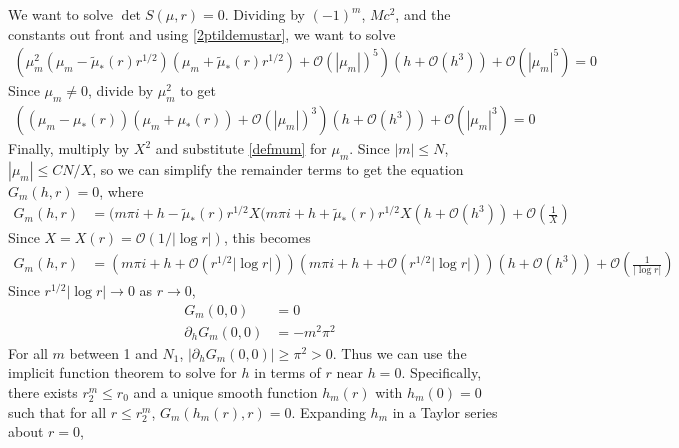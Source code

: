 \documentclass[thesis.tex]{subfiles}
\begin{document}
We want to solve $\det S(\mu, r) = 0$. Dividing by $(-1)^m$, $M c^2$, and the constants out front and using \cref{2ptildemustar}, we want to solve 
\begin{equation}\label{Bess2}
\begin{aligned}
\left(\mu_m^2 (\mu_m - \tilde{\mu}_*(r)r^{1/2})(\mu_m + \tilde{\mu}_*(r)r^{1/2}) + \mathcal{O}( |\mu_m|)^5 \right) \left( h + \mathcal{O}(h^3) \right) + \mathcal{O}\left( |\mu_m|^5 \right) = 0
\end{aligned}
\end{equation}
Since $\mu_m \neq 0$, divide by $\mu_m^2$ to get
\begin{equation}\label{Bess3}
\begin{aligned}
\left((\mu_m - \mu_*(r))(\mu_m + \mu_*(r)) + \mathcal{O}( |\mu_m|)^3 \right) \left( h + \mathcal{O}(h^3) \right) + \mathcal{O}\left( |\mu_m|^3 \right) = 0
\end{aligned}
\end{equation}
Finally, multiply by $X^2$ and substitute \cref{defmum} for $\mu_m$. Since $|m| \leq N$, $|\mu_m| \leq C N/X$, so we can simplify the remainder terms to get the equation $G_m(h, r) = 0$, where
\begin{equation}\label{Bess4}
\begin{aligned}
G_m(h, r) &= (m \pi i + h - \tilde{\mu}_*(r) r^{1/2} X(m \pi i + h + \tilde{\mu}_*(r) r^{1/2} X \left( h + \mathcal{O}(h^3) \right) + \mathcal{O}\left( \frac{1}{X} \right)
\end{aligned}
\end{equation}
Since $X = X(r) = \mathcal{O}(1/|\log r|)$, this becomes
\begin{equation}\label{Bess4}
\begin{aligned}
G_m(h, r) &= \left( m \pi i + h + \mathcal{O}(r^{1/2}|\log r|) \right)\left(m \pi i + h + + \mathcal{O}(r^{1/2}|\log r|) \right) \left( h + \mathcal{O}(h^3) \right) + \mathcal{O}\left( \frac{1}{|\log r|} \right)
\end{aligned}
\end{equation}
Since $r^{1/2}|\log r| \rightarrow 0$ as $r \rightarrow 0$,
\begin{align*}
G_m(0,0) &= 0 \\
\partial_h G_m(0,0) &= -m^2 \pi^2
\end{align*}
For all $m$ between 1 and $N_1$, $|\partial_h G_m(0,0)| \geq \pi^2 > 0$. Thus we can use the implicit function theorem to solve for $h$ in terms of $r$ near $h = 0$. Specifically, there exists $r_2^m \leq r_0$ and a unique smooth function $h_m(r)$ with $h_m(0) = 0$ such that for all $r \leq r_2^m$, $G_m(h_m(r),r) = 0$. Expanding $h_m$ in a Taylor series about $r = 0$,
\end{document}
